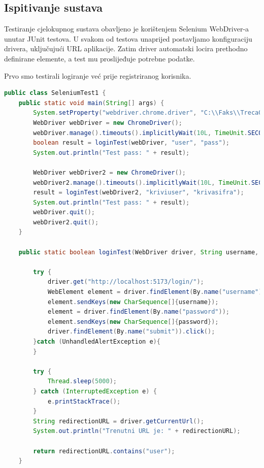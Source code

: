 			\eject
			
			
			
			
			
			\subsection{Ispitivanje sustava}
			
			 Testiranje cjelokupnog sustava obavljeno je korištenjem Selenium WebDriver-a unutar JUnit testova. U svakom od testova unaprijed postavljamo konfiguraciju drivera, uključujući URL aplikacije. Zatim driver automatski locira prethodno definirane elemente, a test mu proslijeđuje potrebne podatke.
    
            Prvo smo testirali logiranje već prije registriranog korisnika.
           \begin{lstlisting}[language=Java, label=8st:java_example, basicstyle=\scriptsize9]
 public class SeleniumTest1 {
    public static void main(String[] args) {
        System.setProperty("webdriver.chrome.driver", "C:\\Faks\\TrecaGod\\PROGI\\Projekt\\chromedriver-win64\\chromedriver.exe");
        WebDriver webDriver = new ChromeDriver();
        webDriver.manage().timeouts().implicitlyWait(10L, TimeUnit.SECONDS);
        boolean result = loginTest(webDriver, "user", "pass");
        System.out.println("Test pass: " + result);

        WebDriver webDriver2 = new ChromeDriver();
        webDriver2.manage().timeouts().implicitlyWait(10L, TimeUnit.SECONDS);
        result = loginTest(webDriver2, "kriviuser", "krivasifra");
        System.out.println("Test pass: " + result);
        webDriver.quit();
        webDriver2.quit();
    }

    public static boolean loginTest(WebDriver driver, String username, String password){

        try {
            driver.get("http://localhost:5173/login/");
            WebElement element = driver.findElement(By.name("username"));
            element.sendKeys(new CharSequence[]{username});
            element = driver.findElement(By.name("password"));
            element.sendKeys(new CharSequence[]{password});
            driver.findElement(By.name("submit")).click();
        }catch (UnhandledAlertException e){
        }

        try {
            Thread.sleep(5000);
        } catch (InterruptedException e) {
            e.printStackTrace();
        }
        String redirectionURL = driver.getCurrentUrl();
        System.out.println("Trenutni URL je: " + redirectionURL);

        return redirectionURL.contains("user");
    }
\end{lstlisting}

